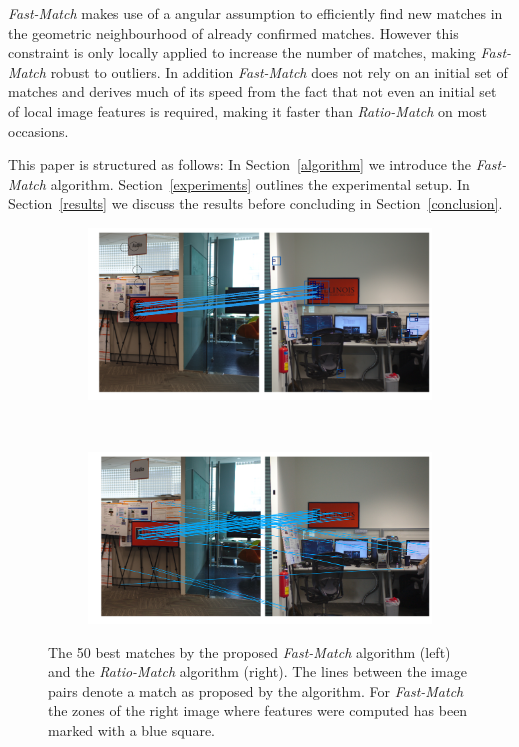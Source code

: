 \documentclass[runningheads]{llncs}
\begin{document}
\emph{Fast-Match} makes use of a angular assumption to efficiently find new matches in the geometric neighbourhood of already confirmed matches. However this constraint is only locally applied to increase the number of matches, making \emph{Fast-Match} robust to outliers. In addition \emph{Fast-Match} does not rely on an initial set of matches and derives much of its speed from the fact that not even an initial set of local image features is required, making it faster than \emph{Ratio-Match} on most occasions.

This paper is structured as follows: In Section~\ref{algorithm} we introduce the \emph{Fast-Match} algorithm. Section~\ref{experiments} outlines the experimental setup. In Section~\ref{results} we discuss the results before concluding in Section~\ref{conclusion}.


\begin{figure}[tb]
    \centering
    \begin{subfigure}[t]{0.5\columnwidth}
        \includegraphics[width=1\columnwidth]{images/Illinois-fastmatch}
    \end{subfigure}%
    ~%
    \begin{subfigure}[t]{0.5\columnwidth}
        \includegraphics[width=1\columnwidth]{images/Illinois-ratiomatch}
    \end{subfigure}%
    \caption{The 50 best matches by the proposed \emph{Fast-Match} algorithm (left) and the \emph{Ratio-Match} algorithm \cite{lowe2004sift} (right). The lines between the image pairs denote a match as proposed by the algorithm. For \emph{Fast-Match} the zones of the right image where features were computed has been marked with a blue square.}
    \label{fig:match_example}
\end{figure}
\end{document}
